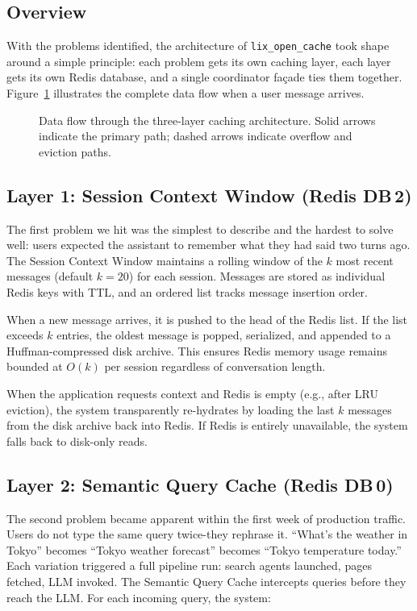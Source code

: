 \documentclass[conference]{IEEEtran}
\begin{document}
\subsection{Overview}

With the problems identified, the architecture of \texttt{lix\_open\_cache} took shape around a simple principle: each problem gets its own caching layer, each layer gets its own Redis database, and a single coordinator fa\c{c}ade ties them together. Figure~\ref{fig:architecture} illustrates the complete data flow when a user message arrives.

\begin{figure}[t]
\centering

\caption{Data flow through the three-layer caching architecture. Solid arrows indicate the primary path; dashed arrows indicate overflow and eviction paths.}
\label{fig:architecture}
\end{figure}

\subsection{Layer 1: Session Context Window (Redis DB\,2)}

The first problem we hit was the simplest to describe and the hardest to solve well: users expected the assistant to remember what they had said two turns ago. The Session Context Window maintains a rolling window of the $k$ most recent messages (default $k{=}20$) for each session. Messages are stored as individual Redis keys with TTL, and an ordered list tracks message insertion order.

When a new message arrives, it is pushed to the head of the Redis list. If the list exceeds $k$ entries, the oldest message is popped, serialized, and appended to a Huffman-compressed disk archive. This ensures Redis memory usage remains bounded at $O(k)$ per session regardless of conversation length.

When the application requests context and Redis is empty (e.g., after LRU eviction), the system transparently re-hydrates by loading the last $k$ messages from the disk archive back into Redis. If Redis is entirely unavailable, the system falls back to disk-only reads.

\subsection{Layer 2: Semantic Query Cache (Redis DB\,0)}

The second problem became apparent within the first week of production traffic. Users do not type the same query twice-they rephrase it. ``What's the weather in Tokyo'' becomes ``Tokyo weather forecast'' becomes ``Tokyo temperature today.'' Each variation triggered a full pipeline run: search agents launched, pages fetched, LLM invoked. The Semantic Query Cache intercepts queries before they reach the LLM. For each incoming query, the system:
\end{document}
